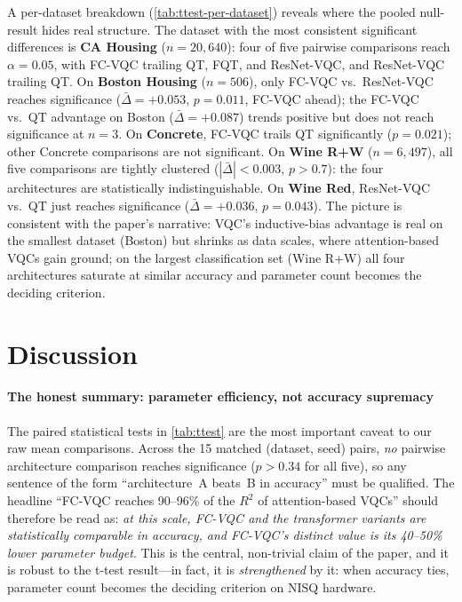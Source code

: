 \documentclass[10pt,conference]{IEEEtran}
\begin{document}
A per-dataset breakdown (\cref{tab:ttest-per-dataset}) reveals where the pooled null-result hides real structure.
The dataset with the most consistent significant differences is \textbf{CA Housing} ($n{=}20{,}640$): four of five pairwise comparisons reach $\alpha{=}0.05$, with FC-VQC trailing QT, FQT, and ResNet-VQC, and ResNet-VQC trailing QT.
On \textbf{Boston Housing} ($n{=}506$), only FC-VQC vs.\ ResNet-VQC reaches significance ($\bar{\Delta}{=}{+}0.053$, $p{=}0.011$, FC-VQC ahead); the FC-VQC vs.\ QT advantage on Boston ($\bar{\Delta}{=}{+}0.087$) trends positive but does not reach significance at $n{=}3$.
On \textbf{Concrete}, FC-VQC trails QT significantly ($p{=}0.021$); other Concrete comparisons are not significant.
On \textbf{Wine R+W} ($n{=}6{,}497$), all five comparisons are tightly clustered ($|\bar{\Delta}|<0.003$, $p>0.7$): the four architectures are statistically indistinguishable.
On \textbf{Wine Red}, ResNet-VQC vs.\ QT just reaches significance ($\bar{\Delta}{=}{+}0.036$, $p{=}0.043$).
The picture is consistent with the paper's narrative: VQC's inductive-bias advantage is real on the smallest dataset (Boston) but shrinks as data scales, where attention-based VQCs gain ground; on the largest classification set (Wine R+W) all four architectures saturate at similar accuracy and parameter count becomes the deciding criterion.



\section{Discussion}
\label{sec:discussion}

\paragraph{The honest summary: parameter efficiency, not accuracy supremacy}
The paired statistical tests in \cref{tab:ttest} are the most important caveat to our raw mean comparisons.
Across the 15 matched (dataset, seed) pairs, \emph{no} pairwise architecture comparison reaches significance ($p>0.34$ for all five), so any sentence of the form ``architecture~A beats~B in accuracy'' must be qualified.
The headline ``FC-VQC reaches 90--96\% of the $R^2$ of attention-based VQCs'' should therefore be read as: \emph{at this scale, FC-VQC and the transformer variants are statistically comparable in accuracy, and FC-VQC's distinct value is its 40--50\% lower parameter budget}.
This is the central, non-trivial claim of the paper, and it is robust to the t-test result---in fact, it is \emph{strengthened} by it: when accuracy ties, parameter count becomes the deciding criterion on NISQ hardware.
\end{document}
